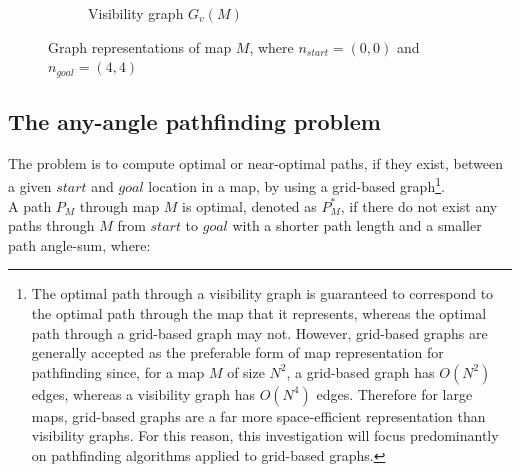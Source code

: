 \documentclass[12pt,notitlepage]{report}
\begin{document}
\begin{figure}
\begin{subfigure}{.5\textwidth}
    \caption{Visibility graph $G_{v}(M)$}
  \end{subfigure}
  \caption[Graph representations of map $M$]{Graph representations of map $M$, where $n_{start} = (0,0)$ and $n_{goal} = (4,4)$}
\end{figure}

\subsection{The any-angle pathfinding problem}

The problem is to compute optimal or near-optimal paths, if they exist, between a given $start$ and $goal$ location in a map, by using a grid-based graph\footnote{The optimal path through a visibility graph is guaranteed to correspond to the optimal path through the map that it represents, whereas the optimal path through a grid-based graph may not\cite{Nash12}. However, grid-based graphs are generally accepted as the preferable form of map representation for pathfinding since, for a map $M$ of size $N^{2}$, a grid-based graph has {$O(N^{2})$} edges, whereas a visibility graph has {$O(N^{4})$} edges. Therefore for large maps, grid-based graphs are a far more space-efficient representation than visibility graphs. For this reason, this investigation will focus predominantly on pathfinding algorithms applied to grid-based graphs.}.\\

\noindent
A path $P_{M}$ through map $M$ is optimal, denoted as $P^{*}_{M}$, if there do not exist any paths through $M$ from $start$ to $goal$ with a shorter path length and a smaller path angle-sum, where:
\end{document}
